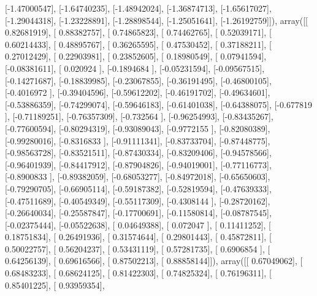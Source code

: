 \documentclass{article}
\begin{document}
       [-1.47000547],
       [-1.64740235],
       [-1.48942024],
       [-1.36874713],
       [-1.65617027],
       [-1.29044318],
       [-1.23228891],
       [-1.28898544],
       [-1.25051641],
       [-1.26192759]]), array([[ 0.82681919],
       [ 0.88382757],
       [ 0.74865823],
       [ 0.74462765],
       [ 0.52039171],
       [ 0.60214433],
       [ 0.48895767],
       [ 0.36265595],
       [ 0.47530452],
       [ 0.37188211],
       [ 0.27012429],
       [ 0.22903981],
       [ 0.23852605],
       [ 0.18980549],
       [ 0.07941594],
       [-0.08381611],
       [ 0.020924  ],
       [-0.1894684 ],
       [-0.05231594],
       [-0.09567515],
       [-0.14271687],
       [-0.18839985],
       [-0.23067855],
       [-0.36191495],
       [-0.46800105],
       [-0.4016972 ],
       [-0.39404596],
       [-0.59612202],
       [-0.46191702],
       [-0.49634601],
       [-0.53886359],
       [-0.74299074],
       [-0.59646183],
       [-0.61401038],
       [-0.64388075],
       [-0.677819  ],
       [-0.71189251],
       [-0.76357309],
       [-0.732564  ],
       [-0.96254993],
       [-0.83435267],
       [-0.77600594],
       [-0.80294319],
       [-0.93089043],
       [-0.9772155 ],
       [-0.82080389],
       [-0.99280016],
       [-0.8316833 ],
       [-0.91111341],
       [-0.83733704],
       [-0.87448775],
       [-0.98563728],
       [-0.83521511],
       [-0.87430334],
       [-0.83209406],
       [-0.94578566],
       [-0.96401939],
       [-0.84417912],
       [-0.87904826],
       [-0.94019001],
       [-0.77116773],
       [-0.8900833 ],
       [-0.89382059],
       [-0.68053277],
       [-0.84972018],
       [-0.65650603],
       [-0.79290705],
       [-0.66905114],
       [-0.59187382],
       [-0.52819594],
       [-0.47639333],
       [-0.47511689],
       [-0.40549349],
       [-0.55117309],
       [-0.4308144 ],
       [-0.28720162],
       [-0.26640034],
       [-0.25587847],
       [-0.17700691],
       [-0.11580814],
       [-0.08787545],
       [-0.02375444],
       [-0.05522638],
       [ 0.04649388],
       [ 0.072047  ],
       [ 0.11411252],
       [ 0.18751834],
       [ 0.26491936],
       [ 0.31574644],
       [ 0.29801443],
       [ 0.45872811],
       [ 0.50022757],
       [ 0.56204237],
       [ 0.53431119],
       [ 0.57281735],
       [ 0.6906854 ],
       [ 0.64256139],
       [ 0.69616566],
       [ 0.87502213],
       [ 0.88858144]]), array([[ 0.67049062],
       [ 0.68483233],
       [ 0.68624125],
       [ 0.81422303],
       [ 0.74825324],
       [ 0.76196311],
       [ 0.85401225],
       [ 0.93959354],
\end{document}
